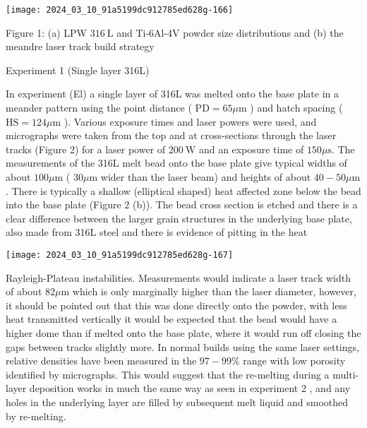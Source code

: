 \documentclass[10pt]{article}
\begin{document}
\begin{center}
\texttt{[image: 2024\_03\_10\_91a5199dc912785ed628g-166]}
\end{center}

Figure 1: (a) LPW $316 \mathrm{~L}$ and Ti-6Al-4V powder size distributions and (b) the meandre laser track build strategy

Experiment 1 (Single layer 316L)

In experiment (El) a single layer of 316L was melted onto the base plate in a meander pattern using the point distance ( $\mathrm{PD}=65 \mu \mathrm{m}$ ) and hatch spacing ( $\mathrm{HS}=124 \mu \mathrm{m}$ ). Various exposure times and laser powers were used, and micrographs were taken from the top and at cross-sections through the laser tracks (Figure 2) for a laser power of $200 \mathrm{~W}$ and an exposure time of $150 \mu \mathrm{s}$. The measurements of the 316L melt bead onto the base plate give typical widths of about $100 \mu \mathrm{m}$ ( $30 \mu \mathrm{m}$ wider than the laser beam) and heights of about $40-50 \mu \mathrm{m}$. There is typically a shallow (elliptical shaped) heat affected zone below the bead into the base plate (Figure 2 (b)). The bead cross section is etched and there is a clear difference between the larger grain structures in the underlying base plate, also made from 316L steel and there is evidence of pitting in the heat

\begin{center}
\texttt{[image: 2024\_03\_10\_91a5199dc912785ed628g-167]}
\end{center}

Rayleigh-Plateau instabilities. Measurements would indicate a laser track width of about $82 \mu \mathrm{m}$ which is only marginally higher than the laser diameter, however, it should be pointed out that this was done directly onto the powder, with less heat transmitted vertically it would be expected that the bead would have a higher dome than if melted onto the base plate, where it would run off closing the gaps between tracks slightly more. In normal builds using the same laser settings,\\
relative densities have been measured in the $97-99 \%$ range with low porosity identified by micrographs. This would suggest that the re-melting during a multi-layer deposition works in much the same way as seen in experiment 2 , and any holes in the underlying layer are filled by subsequent melt liquid and smoothed by re-melting.
\end{document}
